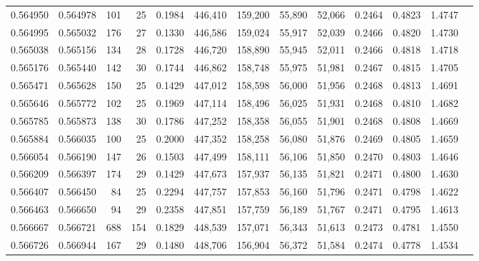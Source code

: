 \begin{tabular}{rrrrrrrrrrrrr}
0.564950 & 0.564978 &    101 &    25 &                                     0.1984 & 446,410 & 159,200 &  55,890 &  52,066 & 0.2464 & 0.4823 & 1.4747 \\
0.564995 & 0.565032 &    176 &    27 &                                     0.1330 & 446,586 & 159,024 &  55,917 &  52,039 & 0.2466 & 0.4820 & 1.4730 \\
0.565038 & 0.565156 &    134 &    28 &                                     0.1728 & 446,720 & 158,890 &  55,945 &  52,011 & 0.2466 & 0.4818 & 1.4718 \\
0.565176 & 0.565440 &    142 &    30 &                                     0.1744 & 446,862 & 158,748 &  55,975 &  51,981 & 0.2467 & 0.4815 & 1.4705 \\
0.565471 & 0.565628 &    150 &    25 &                                     0.1429 & 447,012 & 158,598 &  56,000 &  51,956 & 0.2468 & 0.4813 & 1.4691 \\
0.565646 & 0.565772 &    102 &    25 &                                     0.1969 & 447,114 & 158,496 &  56,025 &  51,931 & 0.2468 & 0.4810 & 1.4682 \\
0.565785 & 0.565873 &    138 &    30 &                                     0.1786 & 447,252 & 158,358 &  56,055 &  51,901 & 0.2468 & 0.4808 & 1.4669 \\
0.565884 & 0.566035 &    100 &    25 &                                     0.2000 & 447,352 & 158,258 &  56,080 &  51,876 & 0.2469 & 0.4805 & 1.4659 \\
0.566054 & 0.566190 &    147 &    26 &                                     0.1503 & 447,499 & 158,111 &  56,106 &  51,850 & 0.2470 & 0.4803 & 1.4646 \\
0.566209 & 0.566397 &    174 &    29 &                                     0.1429 & 447,673 & 157,937 &  56,135 &  51,821 & 0.2471 & 0.4800 & 1.4630 \\
0.566407 & 0.566450 &     84 &    25 &                                     0.2294 & 447,757 & 157,853 &  56,160 &  51,796 & 0.2471 & 0.4798 & 1.4622 \\
0.566463 & 0.566650 &     94 &    29 &                                     0.2358 & 447,851 & 157,759 &  56,189 &  51,767 & 0.2471 & 0.4795 & 1.4613 \\
0.566667 & 0.566721 &    688 &   154 &                                     0.1829 & 448,539 & 157,071 &  56,343 &  51,613 & 0.2473 & 0.4781 & 1.4550 \\
0.566726 & 0.566944 &    167 &    29 &                                     0.1480 & 448,706 & 156,904 &  56,372 &  51,584 & 0.2474 & 0.4778 & 1.4534 \\

\end{tabular}
